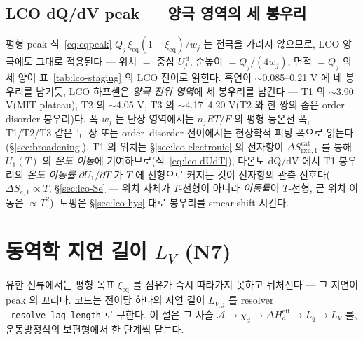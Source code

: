 \documentclass[11pt,a4paper]{article}
\newcommand{\eff}{\mathrm{eff}}
\newcommand{\eq}{\mathrm{eq}}
\newcommand{\rxn}{\mathrm{rxn}}
\newcommand{\code}[1]{\texttt{#1}}
\begin{document}
\subsection{LCO dQ/dV peak — 양극 영역의 세 봉우리}\label{sec:lco-peak}
평형 peak 식~\eqref{eq:eqpeak} $Q_j\,\xi_\eq(1-\xi_\eq)/w_j$ 는 전극을 가리지 않으므로, LCO 양극에도 그대로 적용된다 —
위치 $=$ 중심 $U_j^{\,d}$, 순높이 $=Q_j/(4w_j)$, 면적 $=Q_j$ 의 세 양이 표~\ref{tab:lco-staging} 의 LCO 전이로 읽힌다.
흑연이 $\sim$0.085--0.21 V 에 네 봉우리를 남기듯, LCO 하프셀은 \emph{양극 전위 영역}에 세 봉우리를 남긴다 — T1 의
$\sim$3.90 V(MIT plateau), T2 의 $\sim$4.05 V, T3 의 $\sim$4.17--4.20 V(T2 와 한 쌍의 좁은 order--disorder 봉우리)다.
폭 $w_j$ 는 단상 영역에서는 $n_jRT/F$ 의 평형 등온선 폭, T1/T2/T3 같은 두-상 또는 order--disorder 전이에서는
현상학적 피팅 폭으로 읽는다(\S\ref{sec:broadening}). T1 의 위치는 \S\ref{sec:lco-electronic} 의 전자항이
$\Delta S_{\rxn,1}^\mathrm{cat}$ 를 통해 $U_1(T)$ 의 \emph{온도 이동}에 기여하므로(식~\eqref{eq:lco-dUdT}), 다온도
dQ/dV 에서 T1 봉우리의 \emph{온도 이동률} $\partial U_1/\partial T$ 가 $T$ 에 선형으로 커지는 것이 전자항의 관측
신호다($\Delta S_{e,1}\propto T$, \S\ref{sec:lco-Se} — 위치 자체가 $T$-선형이 아니라 \emph{이동률}이 $T$-선형, 곧 위치
이동은 $\propto T^2$). 도핑은 \S\ref{sec:lco-hys} 대로 봉우리를 smear$\cdot$shift 시킨다.

\section{동역학 지연 길이 $L_V$ (N7)}\label{sec:lag}
유한 전류에서는 평형 목표 $\xi_\eq$ 를 점유가 즉시 따라가지 못하고 뒤처진다 — 그 지연이 peak 의 꼬리다. 코드는 전이당
하나의 지연 길이 $L_{V,j}$ 를 resolver \code{\_resolve\_lag\_length} 로 구한다. 이 절은 그 사슬
$\mathcal A\to\chi_d\to\Delta H_a^\eff\to L_q\to L_V$ 를, 운동방정식의 보편형에서 한 단계씩 닫는다.
\end{document}

